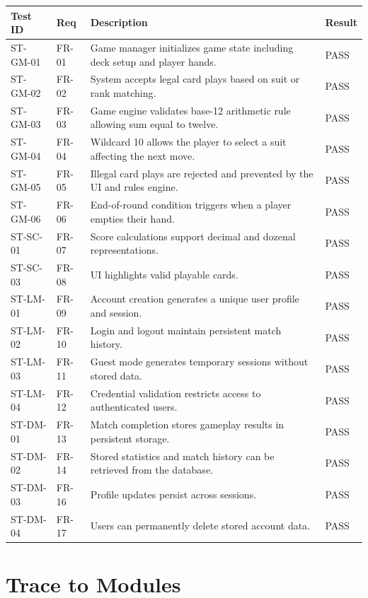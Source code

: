 \documentclass[12pt, titlepage]{article}
\begin{document}
      \begin{tabular}{l l p{9cm} l}
      \toprule
      \textbf{Test ID} & \textbf{Req} & \textbf{Description} & \textbf{Result}\\
      \midrule
      ST-GM-01 & FR-01 & Game manager initializes game state including deck setup and player hands. & PASS\\
      ST-GM-02 & FR-02 & System accepts legal card plays based on suit or rank matching. & PASS\\
      ST-GM-03 & FR-03 & Game engine validates base-12 arithmetic rule allowing sum equal to twelve. & PASS\\
      ST-GM-04 & FR-04 & Wildcard 10 allows the player to select a suit affecting the next move. & PASS\\
      ST-GM-05 & FR-05 & Illegal card plays are rejected and prevented by the UI and rules engine. & PASS\\
      ST-GM-06 & FR-06 & End-of-round condition triggers when a player empties their hand. & PASS\\
      ST-SC-01 & FR-07 & Score calculations support decimal and dozenal representations. & PASS\\
      ST-SC-03 & FR-08 & UI highlights valid playable cards. & PASS\\
      ST-LM-01 & FR-09 & Account creation generates a unique user profile and session. & PASS\\
      ST-LM-02 & FR-10 & Login and logout maintain persistent match history. & PASS\\
      ST-LM-03 & FR-11 & Guest mode generates temporary sessions without stored data. & PASS\\
      ST-LM-04 & FR-12 & Credential validation restricts access to authenticated users. & PASS\\
      ST-DM-01 & FR-13 & Match completion stores gameplay results in persistent storage. & PASS\\
      ST-DM-02 & FR-14 & Stored statistics and match history can be retrieved from the database. & PASS\\
      ST-DM-03 & FR-16 & Profile updates persist across sessions. & PASS\\
      ST-DM-04 & FR-17 & Users can permanently delete stored account data. & PASS\\
      \bottomrule
      \end{tabular}


    \section{Trace to Modules}
\end{document}
